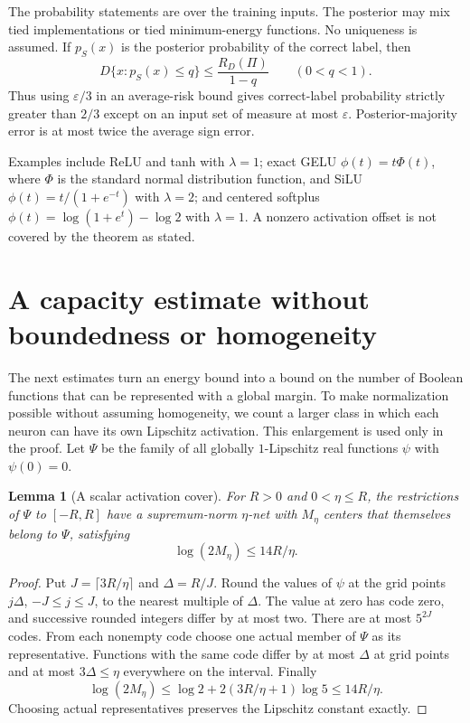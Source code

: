 \documentclass[11pt]{article}
\newtheorem{lemma}[theorem]{Lemma}
\theoremstyle{remark}\newtheorem{remark}[theorem]{Remark}
\begin{document}
The probability statements are over the training inputs. The posterior may mix tied implementations or tied minimum-energy functions. No uniqueness is assumed. If $p_S(x)$ is the posterior probability of the correct label, then
\begin{equation}\label{eq:confidence}
 D\{x:p_S(x)\le q\}\le \frac{R_D(\Pi)}{1-q}\qquad(0<q<1).
\end{equation}
Thus using $\varepsilon/3$ in an average-risk bound gives correct-label probability strictly greater than $2/3$ except on an input set of measure at most $\varepsilon$. Posterior-majority error is at most twice the average sign error.

Examples include ReLU and tanh with $\lambda=1$; exact GELU $\phi(t)=t\Phi(t)$, where $\Phi$ is the standard normal distribution function, and SiLU $\phi(t)=t/(1+e^{-t})$ with $\lambda=2$; and centered softplus $\phi(t)=\log(1+e^t)-\log2$ with $\lambda=1$. A nonzero activation offset is not covered by the theorem as stated.

\section{A capacity estimate without boundedness or homogeneity}
The next estimates turn an energy bound into a bound on the number of Boolean functions that can be represented with a global margin. To make normalization possible without assuming homogeneity, we count a larger class in which each neuron can have its own Lipschitz activation. This enlargement is used only in the proof.
Let $\Psi$ be the family of all globally $1$-Lipschitz real functions $\psi$ with $\psi(0)=0$.

\begin{lemma}[A scalar activation cover]\label{lem:activation-net}
For $R>0$ and $0<\eta\le R$, the restrictions of $\Psi$ to $[-R,R]$ have a supremum-norm $\eta$-net with $M_\eta$ centers that themselves belong to $\Psi$, satisfying
\[
 \log(2M_\eta)\le14R/\eta.
\]
\end{lemma}
\begin{proof}
Put $J=\lceil3R/\eta\rceil$ and $\Delta=R/J$. Round the values of $\psi$ at the grid points $j\Delta$, $-J\le j\le J$, to the nearest multiple of $\Delta$. The value at zero has code zero, and successive rounded integers differ by at most two. There are at most $5^{2J}$ codes. From each nonempty code choose one actual member of $\Psi$ as its representative. Functions with the same code differ by at most $\Delta$ at grid points and at most $3\Delta\le\eta$ everywhere on the interval. Finally
\[
 \log(2M_\eta)\le\log2+2(3R/\eta+1)\log5\le14R/\eta.
\]
Choosing actual representatives preserves the Lipschitz constant exactly.
\end{proof}
\end{document}
